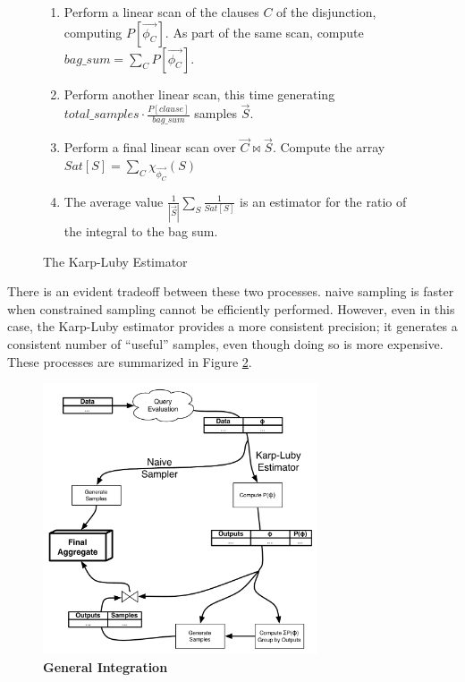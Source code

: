 \begin{figure}
\begin{center}
\begin{enumerate}
\item Perform a linear scan of the clauses $C$ of the disjunction, computing $P[\vec{\phi_C}]$.  As part of the same scan, compute $bag\_sum = \sum_C P[\vec{\phi_C}]$.  
\item Perform another linear scan, this time generating $total\_samples \cdot \frac{P[clause]}{bag\_sum}$ samples $\vec{S}$. 
\item Perform a final linear scan over $\vec{C} \bowtie \vec{S}$.  Compute the array $Sat[S] = \sum_C \chi_{\vec{\phi_C}}(S)$
\item The average value $\frac{1}{|\vec{S}|} \sum_{S}\frac{1}{Sat[S]}$ is an estimator for the ratio of the integral to the bag sum. 
\end{enumerate}
\caption{The Karp-Luby Estimator}
\label{fig:klestimator}
\end{center}
\end{figure}


There  is an  evident  tradeoff between  these  two processes.   naive
sampling is  faster when constrained  sampling cannot  be efficiently
performed.   However,  even  in  this case,  the  Karp-Luby  estimator
provides a more consistent precision; it generates a consistent number
of ``useful'' samples, even though  doing so is more expensive.  These
processes are summarized in Figure \ref{fig:integration}.


\begin{figure}
\begin{center}
\includegraphics[width=3.2in]{graphics/sampling_flowchart.pdf}
\end{center}

\vspace{-5mm}

\caption{\textbf{General Integration}}
\label{fig:integration}
\end{figure}


